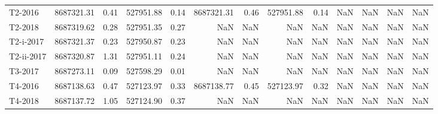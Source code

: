 \begin{tabular}{lrrrrrrrrrrrr}
     T2-2016 &                8687321.31 &                            0.41 &                527951.88 &                           0.14 &                8687321.31 &                            0.46 &                527951.88 &                           0.14 &                       NaN &                             NaN &                      NaN &                            NaN \\
     T2-2018 &                8687319.62 &                            0.28 &                527951.35 &                           0.27 &                       NaN &                             NaN &                      NaN &                            NaN &                       NaN &                             NaN &                      NaN &                            NaN \\
   T2-i-2017 &                8687321.37 &                            0.23 &                527950.87 &                           0.23 &                       NaN &                             NaN &                      NaN &                            NaN &                       NaN &                             NaN &                      NaN &                            NaN \\
  T2-ii-2017 &                8687320.87 &                            1.31 &                527951.11 &                           0.24 &                       NaN &                             NaN &                      NaN &                            NaN &                       NaN &                             NaN &                      NaN &                            NaN \\
     T3-2017 &                8687273.11 &                            0.09 &                527598.29 &                           0.01 &                       NaN &                             NaN &                      NaN &                            NaN &                       NaN &                             NaN &                      NaN &                            NaN \\
     T4-2016 &                8687138.63 &                            0.47 &                527123.97 &                           0.33 &                8687138.77 &                            0.45 &                527123.97 &                           0.32 &                       NaN &                             NaN &                      NaN &                            NaN \\
     T4-2018 &                8687137.72 &                            1.05 &                527124.90 &                           0.37 &                       NaN &                             NaN &                      NaN &                            NaN &                       NaN &                             NaN &                      NaN &                            NaN \\

\end{tabular}
